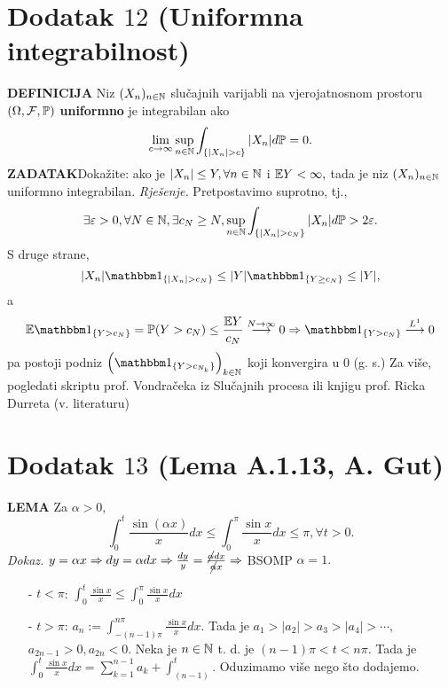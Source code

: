 \documentclass{article}
\begin{document}
\section{Dodatak \(12\) (Uniformna integrabilnost)}
\textbf{DEFINICIJA}\newline 
Niz \((X_n)_{n\in\Bbb N}\) slučajnih varijabli na vjerojatnosnom prostoru \((\Omega,\mathcal F,\Bbb P)\) \textbf{uniformno} je integrabilan ako \[\lim_{c\to\infty}\sup_{n\in\Bbb N}\int_{\{|X_n|>c\}}|X_n|d\Bbb P=0.\]
\textbf{ZADATAK}\newline Dokažite: ako je \(|X_n|\le Y,\forall n\in\Bbb N\) i \(\Bbb EY<\infty,\) tada je niz \((X_n)_{n\in\Bbb N}\) uniformno integrabilan.\newline\newline
\textit{Rješenje.}\newline
Pretpostavimo suprotno, tj., \[\exists\varepsilon>0,\forall N\in\Bbb N,\exists c_N\ge N,\sup_{n\in\Bbb N}\int_{\{|X_n|>c_N\}}|X_n|d\Bbb P>2\varepsilon.\] S druge strane, \[|X_n|\mathbbm 1_{\{|X_n|>c_N\}}\le|Y|\mathbbm 1_{\{Y\ge c_N\}}\le|Y|,\] a \[\Bbb E\mathbbm 1_{\{Y>c_N\}}=\Bbb P(Y>c_N)\le\frac{\Bbb EY}{c_N}\overset{N\to\infty}{\longrightarrow}0\Rightarrow\mathbbm 1_{\{Y>c_N\}}\overset{L^1}{\longrightarrow}0\] pa postoji podniz \(\left(\mathbbm 1_{\{Y>c_{N_k}\}}\right)_{k\in\Bbb N}\) koji konvergira u \(0\) (g. s.)\newline\newline
Za više, pogledati skriptu prof. Vondračeka iz Slučajnih procesa ili knjigu prof. Ricka Durreta (v. literaturu)
\newpage
\section{Dodatak \(13\) (Lema A.1.13, A. Gut)}
\textbf{LEMA}\newline
Za \(\alpha>0,\) \[\int_0^t\frac{\sin(\alpha x)}xdx\le\int_0^\pi\frac{\sin x}xdx\le\pi,\forall t>0.\]
\textit{Dokaz.}\newline 
\(y=\alpha x\Rightarrow dy=\alpha dx\Rightarrow\frac{dy}y=\frac{\cancel{\alpha} dx}{\cancel{\alpha} x}\Rightarrow\) BSOMP \(\alpha=1.\) \begin{enumerate}
        \item[-] \(t<\pi\): \(\int_0^t\frac{\sin x}x\le\int_0^\pi\frac{\sin x}xdx\)
        \item[-] \(t>\pi\): \(a_n:=\int_{-(n-1)\pi}^{n\pi}\frac{\sin x}xdx.\) Tada je \(a_1>|a_2|>a_3>|a_4|>\cdots,\) \(a_{2n-1}>0,a_{2n}<0.\) Neka je \(n\in\Bbb N\) t. d. je \((n-1)\pi<t<n\pi.\) Tada je \(\int_0^t\frac{\sin x}xdx=\sum_{k=1}^{n-1}a_k+\int_{(n-1)}^t.\) Oduzimamo više nego što dodajemo.
\end{enumerate}
\newpage
\end{document}
